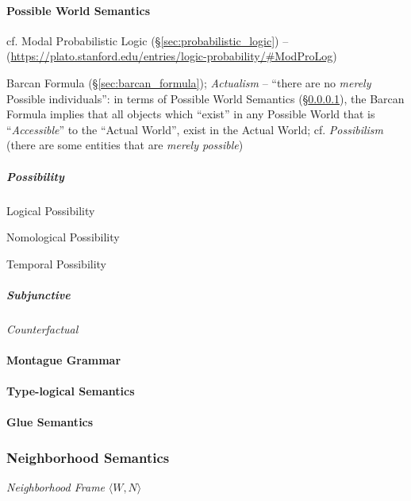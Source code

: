 \paragraph{Possible World Semantics}\label{sec:possible_world}\hfill

cf. Modal Probabilistic Logic (\S\ref{sec:probabilistic_logic}) --
(\url{https://plato.stanford.edu/entries/logic-probability/#ModProLog})

\fist Barcan Formula (\S\ref{sec:barcan_formula}); \emph{Actualism} -- ``there
are no \emph{merely} Possible individuals'': in terms of Possible World
Semantics (\S\ref{sec:possible_world}), the Barcan Formula implies that all
objects which ``exist'' in any Possible World that is ``\emph{Accessible}'' to
the ``Actual World'', exist in the Actual World; cf. \emph{Possibilism} (there
are some entities that are \emph{merely possible})



\subparagraph{Possibility}\label{sec:possibility}\hfill

Logical Possibility

Nomological Possibility

Temporal Possibility

\subparagraph{Subjunctive}\label{sec:subjunctive}\hfill

\emph{Counterfactual}



\paragraph{Montague Grammar}\label{sec:montague_grammar}\hfill

\paragraph{Type-logical Semantics}\label{sec:typelogical_semantics}\hfill

\paragraph{Glue Semantics}\label{sec:glue_semantics}\hfill



\subsubsection{Neighborhood Semantics}
\label{sec:neighborhood_semantics}

\emph{Neighborhood Frame} $\langle W, N \rangle$




